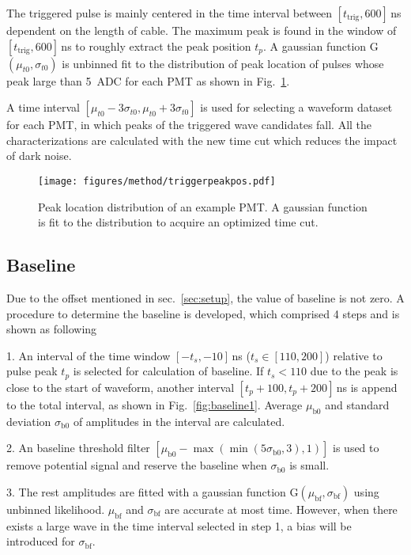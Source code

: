 The triggered pulse is mainly centered in the time interval between $[t_{\mathrm{trig}}, 600]$\,ns dependent on the length of cable. The maximum peak is found in the window of $[t_{\mathrm{trig}}, 600]$\,ns to roughly extract the peak position $t_p$. A gaussian function G$(\mu_{t0},\sigma_{t0})$ is unbinned fit to the distribution of peak location of pulses whose peak large than \SI{5}{ADC} for each PMT as shown in Fig.~\ref{fig:peaklocation}.

A time interval $[\mu_{t0}-3\sigma_{t0}, \mu_{t0}+3\sigma_{t0}]$ is used for selecting a waveform dataset for each PMT, in which peaks of the triggered wave candidates fall. All the characterizations are calculated with the new time cut which reduces the impact of dark noise.

\begin{figure}[!htbp]
    \centering
    \texttt{[image: figures/method/triggerpeakpos.pdf]}
    \caption{Peak location distribution of an example PMT. A gaussian function is fit to the distribution to acquire an optimized time cut.}%
    \label{fig:peaklocation}
\end{figure}
\subsection{Baseline}
Due to the offset mentioned in sec.~\ref{sec:setup}, the value of baseline is not zero. A procedure to determine the baseline is developed, which comprised 4 steps and is shown as following

1. An interval of the time window $[-t_s,-10]$\,ns ($t_s\in[110,200]$) relative to pulse peak $t_p$ is selected for calculation of baseline. If $t_s < 110$ due to the peak is close to the start of waveform, another interval $[t_p+100,t_p+200]$\,ns is append to the total interval, as shown in Fig.~\ref{fig:baseline1}. Average $\mu_{\mathrm{b0}}$ and standard deviation $\sigma_{\mathrm{b0}}$ of amplitudes in the interval are calculated.

2. An baseline threshold filter $[\mu_{\mathrm{b0}}-\max(\min(5\sigma_{\mathrm{b0}},3),1)]$ is used to remove potential signal and reserve the baseline when $\sigma_{\mathrm{b0}}$ is small.

3. The rest amplitudes are fitted with a gaussian function G$(\mu_{\mathrm{bf}},\sigma_{\mathrm{bf}})$ using unbinned likelihood. $\mu_{\mathrm{bf}}$ and $\sigma_{\mathrm{bf}}$ are accurate at most time. However, when there exists a large wave in the time interval selected in step 1, a bias will be introduced for $\sigma_{\mathrm{bf}}$.


